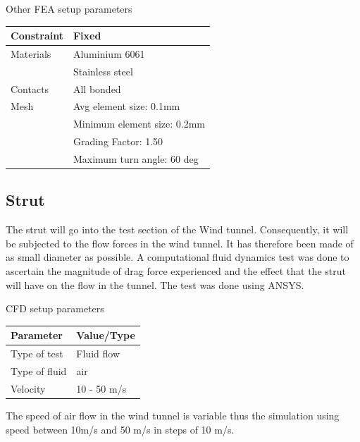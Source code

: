 \begin{center}
	\begin{table}[!h]
		\caption[FEA Setup]{Other FEA setup parameters}
		\centering
	\end{table}
	\begin{tabular}{|l|l|}
		\hline
		Constraint & Fixed                       \\
		\hline
		Materials  & Aluminium 6061              \\
		           & Stainless steel             \\
		\hline
		Contacts   & All bonded                  \\
		\hline
		Mesh       & Avg element size: 0.1mm     \\
		           & Minimum element size: 0.2mm \\
		           & Grading Factor: 1.50        \\
		           & Maximum turn angle: 60 deg  \\
		\hline
	\end{tabular}
\end{center}

\subsection{Strut}
The strut will go into the test section of the Wind tunnel. Consequently, it will be
subjected to the flow forces in the wind tunnel. It has therefore been made of as small diameter as possible.
A computational fluid dynamics test was done to ascertain the magnitude of drag force experienced and the effect that the strut
will have on the flow in the tunnel. The test was done using ANSYS.
\begin{center}
	\begin{table}[!h]
		\caption[CFD Setup]{CFD setup parameters}
		\centering
	\end{table}
	\begin{tabular}{|l|l|}
		\hline
		\textbf{Parameter} & \textbf{Value/Type} \\
		\hline
		Type of test       & Fluid flow          \\
		\hline
		Type of fluid      & air                 \\
		\hline
		Velocity           & 10 - 50 m/s         \\
		\hline
	\end{tabular}
\end{center}
The speed of air flow in the wind tunnel is variable thus the simulation using speed between 10m/s and 50 m/s
in steps of 10 m/s.

